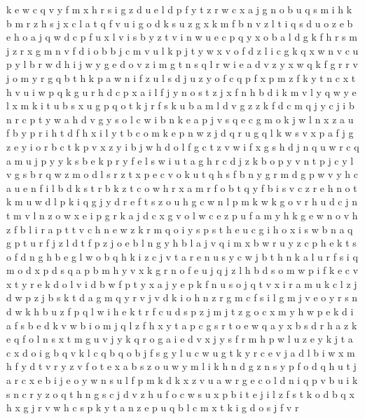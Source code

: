 \documentclass{article}
\begin{document}
k e w c q v y f m x h r s i g z d u
e l d p f y t z r w c x a j g n o b u q s m i h k
b m r z h s j x c l a t q f v u i g o d k
s u z
g x k m f b n v z l t i q s d u o
z e b
e h o a j q w d c p f u x l v i s b y z
t v i n w u e c p q y x o b a l d g k f h r s m j z
r x g m n v f d i o b
b j c
m v u l k p j t y
w x v o
f d z l i c g k q x w n v
c u p y l b r w d h i j
w y g e
d o v z i m g t n s q l r w
i e a d v z y x w q k f g r
r
v j o m y r g q b t h k p a w n i f z u l s
d j u z y o f c q p
f
x p m z f k y t
n c x t h v u i w p
q k g u r h d c p x a i l f j y n o s t
z j x f n h b d i k m v l y q w
y e l x m k i t u b
s
x u
g p q o t k j r f
s k u b a m l d v g z
z k f d c m q j
y c
j i b n r c p t y w a h
d v g y s o l c w i b n k e a p j
v s q e c g m o k j w l n x z a u f b y p r i h t d
f h x i l y t b c o m k e p n w z j d q r u g
q l k w s v x p a f j g z e y i o r b
c t k p v x z y i b j w h d o l f g
c t z v w i f x g s h d j n q u
w r c q a m u j p y
y k s b e
k p r y
f e l s w i u t a g h r c d j z k b o p y v
n t p j c y l v g s b r q w z m o d
l s r z t x
p e c v o k u t q h s f b n y g r m d
g p w v y h c a u e n f i l b d k s t r
b k z t c o w h r x a
m r f o b t
q y f b i s v c z r e h n o t k m u w d l p
k i q g j y d
r e f t s z o u h g c w n l p m k
w k g o v r h u d c j n
t m v l n z o w x e i p g r k a j d c
x g v o l w c e z p u f a m y h
k g e w n o v h z f b l i r a p t
t v c h n e w z k r m q o i y s p
s t h e u c g i
h o x i s w b n a q g p t u r f j z l d
t
f p z j o e b l n g
y h b
l a j v q i m x b w r u y z c p h e k t s o f d n g
h b e
g l w o b q h k i z c j v t a r e n u s
y c w j b t h n k a l u r f s i q m o d x p
d s q a p b m h y v x k g r n o f e u j
q j z l h b d s o m w p i f k e c v x t y r
e k d
o l v i d b w f p t y x a j
y e p k f n u s o j q t v x i r a m
u k c l z j d w p
z j b s k t d a g m q y r v
j v d k i o h n z r g m c f s
i l g m j v e o y r s n d w k h b u z f p q
l w i h e k t r f c u d s p z j m
j t z g o c x m y h w p e k d i a f s b
e d k v w b i o m j q l z f h x y t a p c g s r
t o e w q a y x b s
d r h a z k e q f o l n s x t m g u v j y
k q r o g a i e d v x j y
s f r m h p w l u z e y k j t a c x d o i g b q v
k l c q b
q o b j f s g y l u c w
u g t k y r c e v j a d l b i w x m
h f y d t v
r
y z v f o t e
x a b s z o u w y m l i k h n d
g z n s y p f o d q h u t j a r c x e b
i j e o y w n s u l f p m k d
k x z v u a w r g e c o l d n i q p
v b u i k s n c r y z o q t h
n g s c j d v z h u f
o c w s u x p b i t e j
i l
z f s t k o d b q x h
x g j r v w h c s p k
y t a n
z e p u q b l c m x t k i g d o s j f v r
\end{document}

